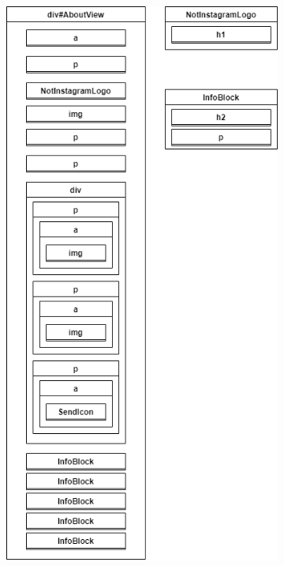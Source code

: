 \documentclass[a4paper, 12pt]{article}
\begin{document}
\begin{figure}
  \begin{center}
    \begin{subfigure}{0.49\linewidth}
      \begin{center}
        \includegraphics[width=\linewidth, keepaspectratio]{diagrams/about-dom.png}

\end{center}
\end{subfigure}
\end{center}
\end{figure}
\end{document}
